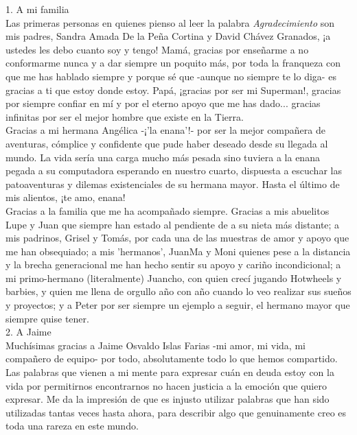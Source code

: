 \documentclass[
11pt, %
spanish, %
singlespacing, %
headsepline, %
]{MastersDoctoralThesis} %
\begin{document}

\begin{acknowledgements}
\addchaptertocentry{\acknowledgementname} %

1. A mi familia\\

Las primeras personas en quienes pienso al leer la palabra \textit{Agradecimiento} son mis padres, Sandra Amada De la Peña Cortina y David Chávez Granados, ¡a ustedes les debo cuanto soy y tengo! Mamá, gracias por enseñarme a no conformarme nunca y a dar siempre un poquito más, por toda la franqueza con que me has hablado siempre y porque sé que -aunque no siempre te lo diga- es gracias a ti que estoy donde estoy. Papá, ¡gracias por ser mi Superman!, gracias por siempre confiar en mí y por el eterno apoyo que me has dado... gracias infinitas por ser el mejor hombre que existe en la Tierra.\\

Gracias a mi hermana Angélica -¡'la enana'!- por ser la mejor compañera de aventuras, cómplice y confidente que pude haber deseado desde su llegada al mundo. La vida sería una carga mucho más pesada sino tuviera a la enana pegada a su computadora esperando en nuestro cuarto, dispuesta a escuchar las patoaventuras y dilemas existenciales de su hermana mayor. Hasta el último de mis alientos, ¡te amo, enana!\\

Gracias a la familia que me ha acompañado siempre. Gracias a mis abuelitos Lupe y Juan que siempre han estado al pendiente de a su nieta más distante; a mis padrinos, Grisel y Tomás, por cada una de las muestras de amor y apoyo que me han obsequiado; a mis 'hermanos', JuanMa y Moni quienes pese a la distancia y la brecha generacional me han hecho sentir su apoyo y cariño incondicional; a mi primo-hermano (literalmente) Juancho, con quien crecí jugando Hotwheels y barbies, y quien me llena de orgullo año con año cuando lo veo realizar sus sueños y proyectos; y a Peter por ser siempre un ejemplo a seguir, el hermano mayor que siempre quise tener.\\ 

2. A Jaime\\

Muchísimas gracias a Jaime Osvaldo Islas Farias -mi amor, mi vida, mi compañero de equipo- por todo, absolutamente todo lo que hemos compartido. Las palabras que vienen a mi mente para expresar cuán en deuda estoy con la vida por permitirnos encontrarnos no hacen justicia a la emoción que quiero expresar. Me da la impresión de que es injusto utilizar palabras que han sido utilizadas tantas veces hasta ahora, para describir algo que genuinamente creo es toda una rareza en este mundo.\\


\end{acknowledgements}
\end{document}
